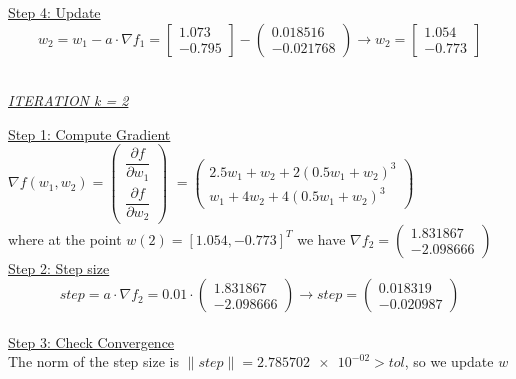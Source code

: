 \underline{Step 4: Update}
\[ 
w_2 = w_1 - a\cdot \nabla f_1 =  \left[\begin{array}{c}
 1.073\\
-0.795
\end{array}\right] - \left(\begin{array}{c}
	0.018516 \\
	-0.021768
\end{array}\right) \rightarrow
w_2 = \left[\begin{array}{c}
	1.054\\
	-0.773
\end{array}\right]
\]
\\[4mm]

\begin{center}
	\underline{\textit{ITERATION k = 2}}
\end{center}

\underline{Step 1: Compute Gradient}\\
\(\nabla f(w_1,w_2) = \left(\begin{array}{c}
	\dfrac{\partial f}{\partial w_1} \\[4mm]
	\dfrac{\partial f}{\partial w_2}
\end{array}\right)\) $= \left(\begin{array}{c}
	2.5w_1 + w_2 + 2(0.5w_1+w_2)^3\\[1mm]
	w_1 + 4w_2 + 4(0.5w_1+w_2)^3
\end{array}\right)$ \\[3mm]

where at the point $w\left(2\right) = \left[1.054, -0.773\right]^T$ we have $\nabla f_{2} = \left(\begin{array}{c}
	1.831867 \\
	-2.098666
\end{array}\right)$
\\[4mm]

\underline{Step 2: Step size}
\[
step = a \cdot \nabla f_{2} = 0.01 \cdot \left(\begin{array}{c}
	1.831867 \\
   -2.098666
\end{array}\right) \rightarrow step =\left(\begin{array}{c}
	0.018319 \\
	-0.020987
\end{array}\right)
\]
\\[4mm]

\underline{Step 3: Check Convergence}\\
The norm of the step size is $\| step \| = \num{2.785702e-02} > tol$, so we update $w$
\\[4mm]

